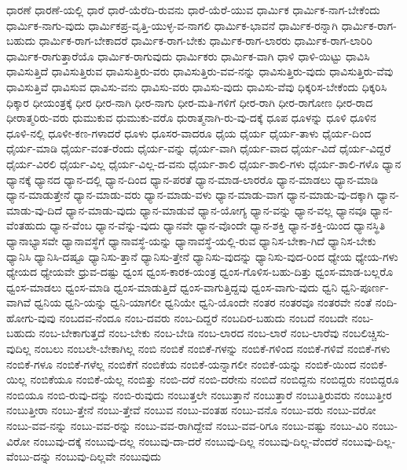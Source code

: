 {ಧಾರಣೆ
ಧಾರಣೆ-ಯಲ್ಲಿ
ಧಾರೆ
ಧಾರೆ-ಯೆರೆದಿ-ರುವನು
ಧಾರೆ-ಯೆರೆ-ಯುವ
ಧಾರ್ಮಿಕ
ಧಾರ್ಮಿಕ-ನಾಗ-ಬೇಕೆಂದು
ಧಾರ್ಮಿಕ-ನಾಗು-ವುದು
ಧಾರ್ಮಿಕಪ್ರ-ವೃತ್ತಿ-ಯುಳ್ಳ-ವ-ನಾಗಲಿ
ಧಾರ್ಮಿಕ-ಭಾವನೆ
ಧಾರ್ಮಿಕ-ರನ್ನಾಗಿ
ಧಾರ್ಮಿಕ-ರಾಗ-ಬಹುದು
ಧಾರ್ಮಿಕ-ರಾಗ-ಬೇಕಾದರೆ
ಧಾರ್ಮಿಕ-ರಾಗ-ಬೇಕು
ಧಾರ್ಮಿಕ-ರಾಗ-ಲಾರರು
ಧಾರ್ಮಿಕ-ರಾಗ-ಲಾರಿರಿ
ಧಾರ್ಮಿಕ-ರಾಗುತ್ತಾರೆಯೊ
ಧಾರ್ಮಿಕ-ರಾಗುವುದು
ಧಾರ್ಮಿಕರು
ಧಾರ್ಮಿಕ-ವಾಗಿ
ಧಾಳಿ
ಧಾಳಿ-ಯಿಟ್ಟು
ಧಾವಿಸಿ
ಧಾವಿಸುತ್ತಿದೆ
ಧಾವಿಸುತ್ತಿರುವ
ಧಾವಿಸುತ್ತಿರು-ವರು
ಧಾವಿಸುತ್ತಿರು-ವವ-ನನ್ನು
ಧಾವಿಸುತ್ತಿರು-ವುದು
ಧಾವಿಸುತ್ತಿರು-ವೆವು
ಧಾವಿಸುತ್ತಿವೆ
ಧಾವಿಸುವ
ಧಾವಿಸು-ವನು
ಧಾವಿಸು-ವರು
ಧಾವಿಸು-ವುದು
ಧಾವಿಸು-ವೆವು
ಧಿಕ್ಕರಿಸ-ಬೇಕೆಂದು
ಧಿಕ್ಕರಿಸಿ
ಧಿಕ್ಕಾರ
ಧೀಯಂತ್ರಕ್ಕೆ
ಧೀರ
ಧೀರ-ನಾಗಿ
ಧೀರ-ನಾಗು
ಧೀರ-ಮತಿ-ಗಳಿಗೆ
ಧೀರ-ರಾಗಿ
ಧೀರ-ರಾಗೋಣ
ಧೀರ-ರಾದ
ಧೀರಾತ್ಮರಿರು-ವರು
ಧುಮುಕುವ
ಧುಮುಕು-ವರೊ
ಧುರಾತ್ಮನಾಗಿ-ರು-ವು-ದಕ್ಕೆ
ಧೂಪ
ಧೂಳನ್ನು
ಧೂಳಿ
ಧೂಳಿನ
ಧೂಳಿ-ನಲ್ಲಿ
ಧೂಳೀ-ಕಣ-ಗಳಾದರೆ
ಧೂಳು
ಧೂಸರ-ವಾದರೂ
ಧೈಯ
ಧೈರ್ಯ
ಧೈರ್ಯ-ತಾಳು
ಧೈರ್ಯ-ದಿಂದ
ಧೈರ್ಯ-ಮಾಡಿ
ಧೈರ್ಯ-ವಂತ-ರೆಂದು
ಧೈರ್ಯ-ವನ್ನು
ಧೈರ್ಯ-ವಾಗಿ
ಧೈರ್ಯ-ವಾದ
ಧೈರ್ಯ-ವಿದೆ
ಧೈರ್ಯ-ವಿದ್ದರೆ
ಧೈರ್ಯ-ವಿರಲಿ
ಧೈರ್ಯ-ವಿಲ್ಲ
ಧೈರ್ಯ-ವಿಲ್ಲ-ದ-ವನು
ಧೈರ್ಯ-ಶಾಲಿ
ಧೈರ್ಯ-ಶಾಲಿ-ಗಳು
ಧೈರ್ಯ-ಶಾಲಿ-ಗಳೊ
ಧ್ಯಾನ
ಧ್ಯಾನಕ್ಕೆ
ಧ್ಯಾನದ
ಧ್ಯಾನ-ದಲ್ಲಿ
ಧ್ಯಾನ-ದಿಂದ
ಧ್ಯಾನ-ಪರತೆ
ಧ್ಯಾನ-ಮಾಡ-ಲಾರರೊ
ಧ್ಯಾನ-ಮಾಡಲು
ಧ್ಯಾನ-ಮಾಡಿ
ಧ್ಯಾನ-ಮಾಡುತ್ತೇನೆ
ಧ್ಯಾನ-ಮಾಡು-ವರು
ಧ್ಯಾನ-ಮಾಡು-ವಳು
ಧ್ಯಾನ-ಮಾಡು-ವಾಗ
ಧ್ಯಾನ-ಮಾಡು-ವು-ದಕ್ಕಾಗಿ
ಧ್ಯಾನ-ಮಾಡು-ವು-ದಿದೆ
ಧ್ಯಾನ-ಮಾಡು-ವುದು
ಧ್ಯಾನ-ಮಾಡುವೆ
ಧ್ಯಾನ-ಯೋಗ್ಯ
ಧ್ಯಾನ-ವನ್ನು
ಧ್ಯಾನ-ವಲ್ಲ
ಧ್ಯಾನವೂ
ಧ್ಯಾನ-ವೆಂತಹುದು
ಧ್ಯಾನ-ವೆಂಬ
ಧ್ಯಾನ-ವೆನ್ನು-ವುದು
ಧ್ಯಾನವೇ
ಧ್ಯಾನ-ವೊಂದೇ
ಧ್ಯಾನ-ಶಕ್ತಿ
ಧ್ಯಾನ-ಶಕ್ತಿ-ಯಿಂದ
ಧ್ಯಾನಸ್ಥಿತಿ
ಧ್ಯಾನಾಭ್ಯಾಸವೇ
ಧ್ಯಾನಾವಸ್ಥೆಗೆ
ಧ್ಯಾನಾವಸ್ಥೆ-ಯನ್ನು
ಧ್ಯಾನಾವಸ್ಥೆ-ಯಲ್ಲಿ-ರುವ
ಧ್ಯಾನಿಸ-ಬೇಕಾ-ಗಿದೆ
ಧ್ಯಾನಿಸ-ಬೇಕು
ಧ್ಯಾನಿಸಿ
ಧ್ಯಾನಿಸಿ-ದಷ್ಟೂ
ಧ್ಯಾನಿಸು-ತ್ತಾನೆ
ಧ್ಯಾನಿಸು-ತ್ತೇನೆ
ಧ್ಯಾನಿಸು-ವುದನ್ನು
ಧ್ಯಾನಿಸು-ವುದ-ರಿಂದ
ಧ್ಯೇಯ
ಧ್ಯೇಯ-ಗಳು
ಧ್ಯೇಯದ
ಧ್ಯೇಯವೇ
ಧ್ರುವ-ದಷ್ಟು
ಧ್ವಂಸ
ಧ್ವಂಸ-ಕಾರಕ-ಯಂತ್ರ
ಧ್ವಂಸ-ಗೊಳಿಸ-ಬಹು-ದಿತ್ತು
ಧ್ವಂಸ-ಮಾಡ-ಬಲ್ಲರೊ
ಧ್ವಂಸ-ಮಾಡಲು
ಧ್ವಂಸ-ಮಾಡಿ
ಧ್ವಂಸ-ಮಾಡುತ್ತಿದೆ
ಧ್ವಂಸ-ವಾಗುತ್ತಿದ್ದವು
ಧ್ವಂಸ-ವಾಗು-ವುದು
ಧ್ವನಿ
ಧ್ವನಿ-ಪೂರ್ಣ-ವಾಗಿವೆ
ಧ್ವನಿಯ
ಧ್ವನಿ-ಯನ್ನು
ಧ್ವನಿ-ಯಾಗಲೀ
ಧ್ವನಿಯೇ
ಧ್ವನಿ-ಯೊಂದೇ
ನಂತರ
ನಂತರವೂ
ನಂತರವೇ
ನಂತೆ
ನಂದಿ-ಹೋಗು-ವುವು
ನಂಬದವ-ನೆಂದೂ
ನಂಬ-ದವರು
ನಂಬ-ದಿದ್ದರೆ
ನಂಬದಿರ-ಬಹುದು
ನಂಬದೆ
ನಂಬದೇ
ನಂಬ-ಬಹುದು
ನಂಬ-ಬೇಕಾಗುತ್ತದೆ
ನಂಬ-ಬೇಕು
ನಂಬ-ಬೇಡಿ
ನಂಬ-ಲಾರದ
ನಂಬ-ಲಾರೆ
ನಂಬ-ಲಾರೆವು
ನಂಬಲಿಚ್ಚಿಸು-ವುದಿಲ್ಲ
ನಂಬಲು
ನಂಬಲೇ-ಬೇಕಾಗಿಲ್ಲ
ನಂಬಿ
ನಂಬಿಕೆ
ನಂಬಿಕೆ-ಗಳನ್ನು
ನಂಬಿಕೆ-ಗಳಿಂದ
ನಂಬಿಕೆ-ಗಳಿವೆ
ನಂಬಿಕೆ-ಗಳು
ನಂಬಿಕೆ-ಗಳೂ
ನಂಬಿಕೆ-ಗಳೆಲ್ಲ
ನಂಬಿಕೆಗೆ
ನಂಬಿಕೆಯ
ನಂಬಿಕೆ-ಯನ್ನಾಗಲೀ
ನಂಬಿಕೆ-ಯನ್ನು
ನಂಬಿಕೆ-ಯಿಂದ
ನಂಬಿಕೆ-ಯಿಲ್ಲ
ನಂಬಿಕೆಯೂ
ನಂಬಿಕೆ-ಯೆಲ್ಲ
ನಂಬಿತ್ತು
ನಂಬಿ-ದರೆ
ನಂಬಿ-ದರೇನು
ನಂಬಿದೆ
ನಂಬಿದ್ದನು
ನಂಬಿದ್ದರು
ನಂಬಿದ್ದರೂ
ನಂಬಿಯೂ
ನಂಬಿ-ರುವು-ದನ್ನು
ನಂಬಿ-ರುವುದು
ನಂಬುತ್ತಲೇ
ನಂಬುತ್ತಾನೆ
ನಂಬುತ್ತಾರೆ
ನಂಬುತ್ತಿರುವರು
ನಂಬುತ್ತೀರ
ನಂಬುತ್ತೀರಾ
ನಂಬು-ತ್ತೇನೆ
ನಂಬು-ತ್ತೇವೆ
ನಂಬುವ
ನಂಬು-ವಂತಹ
ನಂಬು-ವನೊ
ನಂಬು-ವರು
ನಂಬು-ವರೋ
ನಂಬು-ವವ-ನನ್ನು
ನಂಬು-ವವ-ರನ್ನು
ನಂಬು-ವವ-ರಾಗಿದ್ದೇವೆ
ನಂಬು-ವವ-ರಿಗೂ
ನಂಬು-ವಷ್ಟು
ನಂಬು-ವಿರಿ
ನಂಬು-ವಿರೋ
ನಂಬುವು-ದಕ್ಕೆ
ನಂಬುವು-ದಲ್ಲ
ನಂಬುವು-ದಾ-ದರೆ
ನಂಬುವು-ದಿಲ್ಲ
ನಂಬುವು-ದಿಲ್ಲ-ವೆಂದರೆ
ನಂಬುವು-ದಿಲ್ಲ-ವೆಂಬು-ದನ್ನು
ನಂಬುವು-ದಿಲ್ಲವೇ
ನಂಬುವುದು
}
